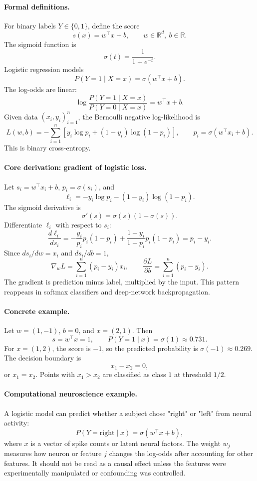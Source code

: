 \paragraph{Formal definitions.}
For binary labels \(Y\in\{0,1\}\), define the score
\[
s(x)=w^\top x+b,
\qquad w\in\mathbb R^d,\ b\in\mathbb R.
\]
The sigmoid function is
\[
\sigma(t)=\frac{1}{1+e^{-t}}.
\]
Logistic regression models
\[
\boxed{
P(Y=1\mid X=x)=\sigma(w^\top x+b).
}
\]
The log-odds are linear:
\[
\log\frac{P(Y=1\mid X=x)}{P(Y=0\mid X=x)}
=w^\top x+b.
\]
Given data \((x_i,y_i)_{i=1}^n\), the Bernoulli negative log-likelihood is
\[
\boxed{
L(w,b)=
-\sum_{i=1}^n
\left[
y_i\log p_i+(1-y_i)\log(1-p_i)
\right],
\qquad
p_i=\sigma(w^\top x_i+b).
}
\]
This is binary cross-entropy.

\paragraph{Core derivation: gradient of logistic loss.}
Let \(s_i=w^\top x_i+b\), \(p_i=\sigma(s_i)\), and
\[
\ell_i=-y_i\log p_i-(1-y_i)\log(1-p_i).
\]
The sigmoid derivative is
\[
\sigma'(s)=\sigma(s)(1-\sigma(s)).
\]
Differentiate \(\ell_i\) with respect to \(s_i\):
\[
\frac{d\ell_i}{ds_i}
=-\frac{y_i}{p_i}p_i(1-p_i)
+\frac{1-y_i}{1-p_i}p_i(1-p_i)
=p_i-y_i.
\]
Since \(ds_i/dw=x_i\) and \(ds_i/db=1\),
\[
\boxed{
\nabla_w L=\sum_{i=1}^n (p_i-y_i)x_i,
\qquad
\frac{\partial L}{\partial b}=\sum_{i=1}^n(p_i-y_i).
}
\]
The gradient is prediction minus label, multiplied by the input. This pattern reappears in softmax classifiers and deep-network backpropagation.

\paragraph{Concrete example.}
Let \(w=(1,-1)\), \(b=0\), and \(x=(2,1)\). Then
\[
s=w^\top x=1,
\qquad
P(Y=1\mid x)=\sigma(1)\approx0.731.
\]
For \(x=(1,2)\), the score is \(-1\), so the predicted probability is \(\sigma(-1)\approx0.269\). The decision boundary is
\[
x_1-x_2=0,
\]
or \(x_1=x_2\). Points with \(x_1>x_2\) are classified as class \(1\) at threshold \(1/2\).

\paragraph{Computational neuroscience example.}
A logistic model can predict whether a subject chose "right" or "left" from neural activity:
\[
P(Y=\text{right}\mid x)=\sigma(w^\top x+b),
\]
where \(x\) is a vector of spike counts or latent neural factors. The weight \(w_j\) measures how neuron or feature \(j\) changes the log-odds after accounting for other features. It should not be read as a causal effect unless the features were experimentally manipulated or confounding was controlled.


